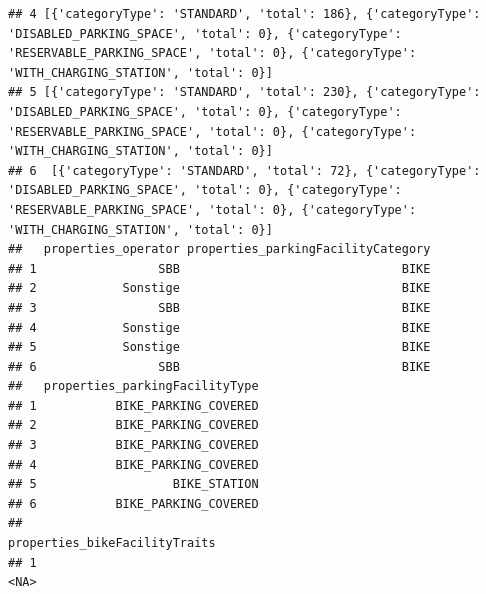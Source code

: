\documentclass[
]{book}
\begin{document}
\begin{verbatim}
## 4 [{'categoryType': 'STANDARD', 'total': 186}, {'categoryType': 'DISABLED_PARKING_SPACE', 'total': 0}, {'categoryType': 'RESERVABLE_PARKING_SPACE', 'total': 0}, {'categoryType': 'WITH_CHARGING_STATION', 'total': 0}]
## 5 [{'categoryType': 'STANDARD', 'total': 230}, {'categoryType': 'DISABLED_PARKING_SPACE', 'total': 0}, {'categoryType': 'RESERVABLE_PARKING_SPACE', 'total': 0}, {'categoryType': 'WITH_CHARGING_STATION', 'total': 0}]
## 6  [{'categoryType': 'STANDARD', 'total': 72}, {'categoryType': 'DISABLED_PARKING_SPACE', 'total': 0}, {'categoryType': 'RESERVABLE_PARKING_SPACE', 'total': 0}, {'categoryType': 'WITH_CHARGING_STATION', 'total': 0}]
##   properties_operator properties_parkingFacilityCategory
## 1                 SBB                               BIKE
## 2            Sonstige                               BIKE
## 3                 SBB                               BIKE
## 4            Sonstige                               BIKE
## 5            Sonstige                               BIKE
## 6                 SBB                               BIKE
##   properties_parkingFacilityType
## 1           BIKE_PARKING_COVERED
## 2           BIKE_PARKING_COVERED
## 3           BIKE_PARKING_COVERED
## 4           BIKE_PARKING_COVERED
## 5                   BIKE_STATION
## 6           BIKE_PARKING_COVERED
##                                                                                                                                                                                                                                                                                                                                                                                                                                                                                                                                                                                                                                                                                                                   properties_bikeFacilityTraits
## 1                                                                                                                                                                                                                                                                                                                                                                                                                                                                                                                                                                                                                                                                                                                                          <NA>

\end{verbatim}
\end{document}
